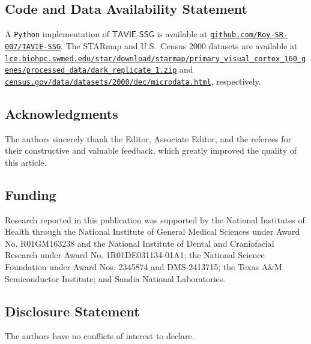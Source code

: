\documentclass[12pt]{article}
\numberwithin{equation}{section}
\newcommand{\tssg}{\mathsf{TAVIE}\text{-}\mathsf{SSG}}
\begin{document}
\subsection*{Code and Data Availability Statement}
%
A \texttt{Python} implementation of $\tssg$ is available at
\href{https://github.com/Roy-SR-007/TAVIE-SSG}
{\nolinkurl{github.com/Roy-SR-007/TAVIE-SSG}}.
The STARmap and U.S.\ Census 2000 datasets are available at
\href{https://lce.biohpc.swmed.edu/star/download/starmap/primary_visual_cortex_160_genes/processed_data/dark_replicate_1.zip}
{\nolinkurl{lce.biohpc.swmed.edu/star/download/starmap/primary_visual_cortex_160_genes/processed_data/dark_replicate_1.zip}}
and
\href{https://www.census.gov/data/datasets/2000/dec/microdata.html}
{\nolinkurl{census.gov/data/datasets/2000/dec/microdata.html}},
respectively.


\subsection*{Acknowledgments}
%
The authors sincerely thank the Editor, Associate Editor, and the referees for their constructive and valuable feedback, which greatly improved the quality of this article.


\subsection*{Funding}
Research reported in this publication was supported by the National Institutes of Health through the National Institute of General Medical Sciences under Award No. R01GM163238 and the National Institute of Dental and Craniofacial Research under Award No. 1R01DE031134-01A1; the National Science Foundation under Award Nos. 2345874 and DMS-2413715; the Texas A\&M Semiconductor Institute; and Sandia National Laboratories.


\subsection*{Disclosure Statement}
%
The authors have no conflicts of interest to declare.
\end{document}
